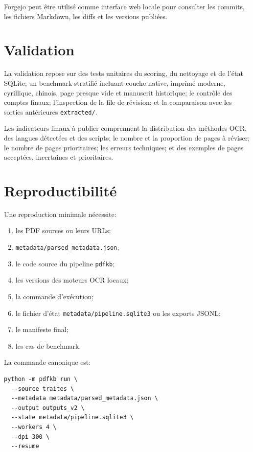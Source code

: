 \documentclass[11pt,a4paper]{article}
\begin{document}
Forgejo peut être utilisé comme interface web locale pour consulter les commits, les fichiers Markdown, les diffs et les versions publiées.

\section{Validation}

La validation repose sur des tests unitaires du scoring, du nettoyage et de l'état SQLite; un benchmark stratifié incluant couche native, imprimé moderne, cyrillique, chinois, page presque vide et manuscrit historique; le contrôle des comptes finaux; l'inspection de la file de révision; et la comparaison avec les sorties antérieures \texttt{extracted/}.

Les indicateurs finaux à publier comprennent la distribution des méthodes OCR, des langues détectées et des scripts; le nombre et la proportion de pages à réviser; le nombre de pages prioritaires; les erreurs techniques; et des exemples de pages acceptées, incertaines et prioritaires.

\section{Reproductibilité}

Une reproduction minimale nécessite:

\begin{enumerate}
  \item les PDF sources ou leurs URLs;
  \item \texttt{metadata/parsed\_metadata.json};
  \item le code source du pipeline \texttt{pdfkb};
  \item les versions des moteurs OCR locaux;
  \item la commande d'exécution;
  \item le fichier d'état \texttt{metadata/pipeline.sqlite3} ou les exports JSONL;
  \item le manifeste final;
  \item les cas de benchmark.
\end{enumerate}

La commande canonique est:

\begin{verbatim}
python -m pdfkb run \
  --source traites \
  --metadata metadata/parsed_metadata.json \
  --output outputs_v2 \
  --state metadata/pipeline.sqlite3 \
  --workers 4 \
  --dpi 300 \
  --resume
\end{verbatim}
\end{document}

